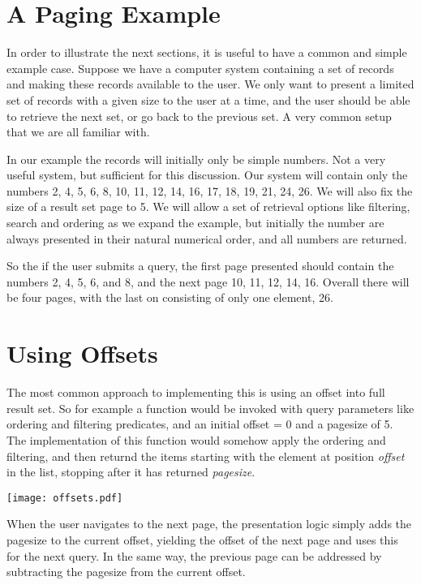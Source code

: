 \documentclass[11pt,a4paper]{article}
\begin{document}
\begin{multicols}{2}
\section*{A Paging Example}
In order to illustrate the next sections, it is useful to have a common and
simple example case. Suppose we have a computer system containing a set of
records and making these records available to the user. We only want to present
a limited set of records with a given size to the user at a time, and the user 
should be able to retrieve the next set, or go back to the previous set. A very
common setup that we are all familiar with.

In our example the records will initially only be simple numbers. Not a very
useful system, but sufficient for this discussion. Our system will contain only
the numbers 2, 4, 5, 6, 8, 10, 11, 12, 14, 16, 17, 18, 19, 21, 24, 26. We will
also fix the size of a result set page to 5. We will allow a set of retrieval
options like filtering, search and ordering as we expand the example, but
initially the number are always presented in their natural numerical order, and
all numbers are returned. 

So the if the user submits a query, the first page presented should contain the
numbers 2, 4, 5, 6, and 8, and the next page 10, 11, 12, 14, 16. Overall there
will be four pages, with the last on consisting of only one element, 26. 

\section*{Using Offsets}
The most common approach to implementing this is using an offset into full
result set. So for example a function would be invoked with query parameters
like ordering and filtering predicates, and an initial offset = 0 and a
pagesize of 5. The implementation of this function would somehow apply the
ordering and filtering, and then returnd the items starting with the element at
position {\em offset} in the list, stopping after it has returned {\em
pagesize}. 

\texttt{[image: offsets.pdf]}

When the user navigates to the next page, the presentation logic simply adds the
pagesize to the current offset, yielding the offset of the next page and uses
this for the next query. In the same way, the previous page can be addressed by
subtracting the pagesize from the current offset. 


\end{multicols}
\end{document}
